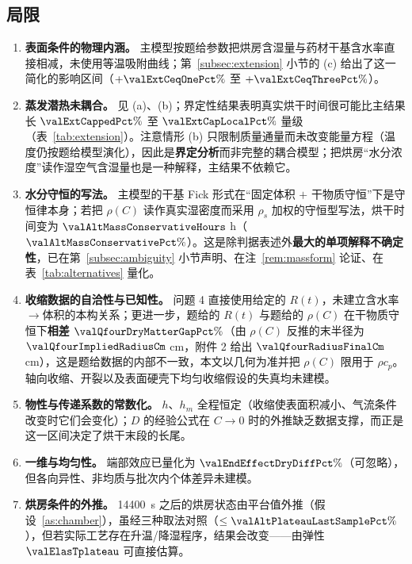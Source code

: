 \subsection{局限}
\begin{enumerate}[leftmargin=*,itemsep=0.2em]
  \item \textbf{表面条件的物理内涵。} 主模型按题给参数把烘房含湿量与药材干基含水率直接相减，未使用等温吸附曲线；第~\ref{subsec:extension} 小节的 (c) 给出了这一简化的影响区间（$+\valExtCeqOnePct\%$ 至 $+\valExtCeqThreePct\%$）。
  \item \textbf{蒸发潜热未耦合。} 见 (a)、(b)；界定性结果表明真实烘干时间很可能比主结果长 $\valExtCappedPct\%$ 至 $\valExtCapLocalPct\%$ 量级（表~\ref{tab:extension}）。注意情形 (b) 只限制质量通量而未改变能量方程（温度仍按题给模型演化），因此是\textbf{界定分析}而非完整的耦合模型；把烘房“水分浓度”读作湿空气含湿量也是一种解释，主结果不依赖它。
  \item \textbf{水分守恒的写法。} 主模型的干基 Fick 形式在“固定体积 $+$ 干物质守恒”下是守恒律本身；若把 $\rho(C)$ 读作真实湿密度而采用 $\rho_s$ 加权的守恒型写法，烘干时间变为 $\valAltMassConservativeHours$ h（$\valAltMassConservativePct\%$）。这是除判据表述外\textbf{最大的单项解释不确定性}，已在第~\ref{subsec:ambiguity} 小节声明、在注~\ref{rem:massform} 论证、在表~\ref{tab:alternatives} 量化。
  \item \textbf{收缩数据的自洽性与已知性。} 问题 4 直接使用给定的 $R(t)$，未建立含水率$\to$体积的本构关系；更进一步，题给的 $R(t)$ 与题给的 $\rho(C)$ 在干物质守恒下\textbf{相差 $\valQfourDryMatterGapPct\%$}（由 $\rho(C)$ 反推的末半径为 $\valQfourImpliedRadiusCm$ \si{\centi\meter}，附件 2 给出 $\valQfourRadiusFinalCm$ \si{\centi\meter}），这是题给数据的内部不一致，本文以几何为准并把 $\rho(C)$ 限用于 $\rho c_p$。轴向收缩、开裂以及表面硬壳下均匀收缩假设的失真均未建模。
  \item \textbf{物性与传递系数的常数化。} $h$、$h_m$ 全程恒定（收缩使表面积减小、气流条件改变时它们会变化）；$D$ 的经验公式在 $C\to0$ 时的外推缺乏数据支撑，而正是这一区间决定了烘干末段的长尾。
  \item \textbf{一维与均匀性。} 端部效应已量化为 $\valEndEffectDryDiffPct\%$（可忽略），但各向异性、非均质与批次内个体差异未建模。
  \item \textbf{烘房条件的外推。} \SI{14400}{\second} 之后的烘房状态由平台值外推（假设~\ref{as:chamber}），虽经三种取法对照（$\le\valAltPlateauLastSamplePct\%$），但若实际工艺存在升温/降湿程序，结果会改变——由弹性 $\valElasTplateau$ 可直接估算。
\end{enumerate}

